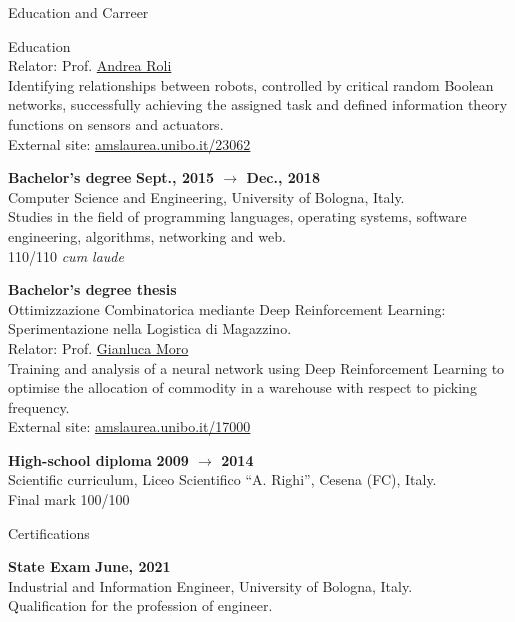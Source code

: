 \documentclass{resume} %
\begin{document}
\begin{rSection}{Education and Carreer}
\begin{rSubsection2}{Education}
            \\Relator: Prof. \href{mailto:andrea.roli@unibo.it}{Andrea Roli}
            \\Identifying relationships between robots, controlled by critical random Boolean networks, successfully achieving the assigned task and defined information theory functions on sensors and actuators.
            \\External site: \url{amslaurea.unibo.it/23062}
            \item\textbf{ Bachelor's degree }\hfill \textbf{Sept., 2015 $\rightarrow$ Dec., 2018}
            \\Computer Science and Engineering, University of Bologna, Italy.
            \\Studies in the field of programming languages, operating systems, software engineering, algorithms, networking and web.
            \\110/110 \emph{cum laude}
            \item\textbf{ Bachelor's degree thesis }
            \\Ottimizzazione Combinatorica mediante Deep Reinforcement Learning: Sperimentazione nella Logistica di Magazzino.
            \\Relator: Prof. \href{mailto:gianluca.moro@unibo.it}{Gianluca Moro}
            \\Training and analysis of a neural network using Deep Reinforcement Learning to optimise the allocation of commodity in a warehouse with respect to picking frequency.
            \\External site: \url{amslaurea.unibo.it/17000}
            \item\textbf{ High-school diploma }\hfill \textbf{2009 $\rightarrow$ 2014}
            \\Scientific curriculum, Liceo Scientifico ``A. Righi'', Cesena (FC), Italy.
            \\Final mark 100/100
        \end{rSubsection2}


        \begin{rSubsection2}{Certifications}

            \item\textbf{ State Exam }\hfill \textbf{June, 2021}
            \\Industrial and Information Engineer, University of Bologna, Italy.
            \\Qualification for the profession of engineer.


\end{rSubsection2}
\end{rSection}
\end{document}
